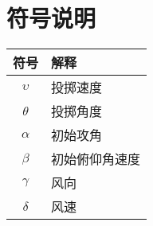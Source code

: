 \documentclass{51mcmthesis}
\begin{document}
\section{符号说明}
\begin{table}[H]
    \centering
    \begin{tabularx}{0.5\linewidth}{c Y}
        \toprule
        \textbf{符号} & \textbf{解释} \\
        \midrule
        $\upsilon$  & 投掷速度        \\
        \hline
        $\theta$    & 投掷角度        \\
        \hline
        $\alpha$    & 初始攻角        \\
        \hline
        $\beta$     & 初始俯仰角速度     \\
        \hline
        $\gamma$    & 风向          \\
        \hline
        $\delta$    & 风速          \\
        \bottomrule
    \end{tabularx}
\end{table}
\end{document}

